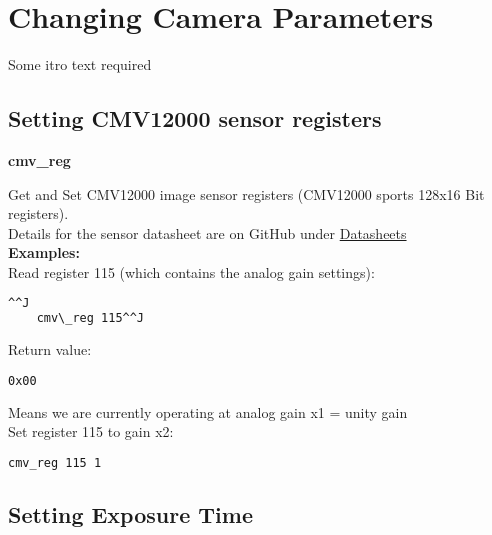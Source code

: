 \section{Changing Camera Parameters}

Some itro text required\\

\subsection{Setting CMV12000 sensor registers}

\textbf{cmv\_reg}

Get and Set CMV12000 image sensor registers (CMV12000 sports 128x16 Bit registers).\\

Details for the sensor datasheet are on GitHub under \href{https://github.com/apertus-open-source-cinema/beta-hardware/tree/master/Datasheets}{Datasheets}\\

\textbf{Examples:}\\

Read register 115 (which contains the analog gain settings): 

\newcommand{\consoleCommand}[1]{%
	\begin{lstlisting}[language=bash,morekeywords=$,keywordstyle=\bfseries,frame=none,xleftmargin=.25in,belowskip=2em, aboveskip=2em]^^J
	#1^^J
	\end{lstlisting}
}

\consoleCommand{cmv\_reg 115}
 

Return value:

\begin{lstlisting}[language=bash,morekeywords=$,keywordstyle=\bfseries,frame=none,xleftmargin=.25in,belowskip=2em, aboveskip=2em]
0x00
\end{lstlisting} 

Means we are currently operating at analog gain x1 = unity gain\\


Set register 115 to gain x2: 

\begin{lstlisting}[language=bash,morekeywords=$,keywordstyle=\bfseries,frame=none,xleftmargin=.25in,belowskip=2em, aboveskip=2em]
cmv_reg 115 1
\end{lstlisting}



\subsection{Setting Exposure Time}

